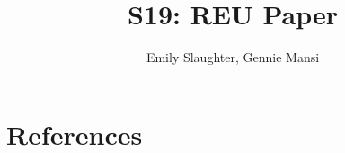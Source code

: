 \documentclass[12pt]{article}
\title{S19: REU Paper}
\author{Emily Slaughter, Gennie Mansi }
\begin{document}
\maketitle

\clearpage

\tableofcontents

\clearpage



\clearpage


\section{References}

\printbibliography
\end{document}
